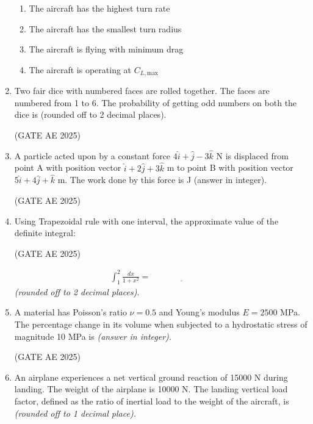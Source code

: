 \documentclass[journal,12pt,onecolumn]{IEEEtran}
\theoremstyle{remark}
\begin{document}
\begin{flushleft}
\begin{enumerate}
\begin{enumerate}
    \item The aircraft has the highest turn rate
    \item The aircraft has the smallest turn radius
    \item The aircraft is flying with minimum drag
    \item The aircraft is operating at $C_{L,\text{max}}$
\end{enumerate}

\item Two fair dice with numbered faces are rolled together. The faces are numbered from 1 to 6. The probability of getting odd numbers on both the dice is \underline{\hspace{3cm}} (rounded off to 2 decimal places).

\hfill (GATE AE 2025)

\item A particle acted upon by a constant force $4\hat{i} + \hat{j} - 3\hat{k}$ N is displaced from point A with position vector $\hat{i} + 2\hat{j} + 3\hat{k}$ m to point B with position vector $5\hat{i} + 4\hat{j} + \hat{k}$ m. The work done by this force is \underline{\hspace{3cm}} J (answer in integer).

\hfill (GATE AE 2025)

\item Using Trapezoidal rule with one interval, the approximate value of the definite integral:

\hfill (GATE AE 2025)

\begin{align*}
\int_{1}^{2} \frac{dx}{1 + x^2}= \underline{\hspace{3cm}}
\end{align*}
\textit{(rounded off to 2 decimal places).}


\item A material has Poisson's ratio $\nu = 0.5$ and Young's modulus $E = 2500$ MPa. The percentage change in its volume when subjected to a hydrostatic stress of magnitude 10 MPa is \underline{\hspace{3cm}} \textit{(answer in integer).}

\hfill (GATE AE 2025)

\item An airplane experiences a net vertical ground reaction of 15000 N during landing. The weight of the airplane is 10000 N. The landing vertical load factor, defined as the ratio of inertial load to the weight of the aircraft, is \underline{\hspace{3cm}} \textit{(rounded off to 1 decimal place).}


\end{enumerate}
\end{flushleft}
\end{document}
